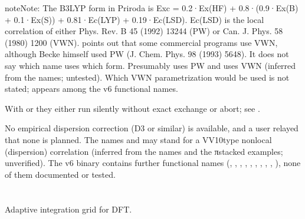 \documentclass[letterpaper,10pt,english,openany,oneside]{sphinxmanual}
\begin{document}
\begin{sphinxadmonition}{note}{Note:}
\sphinxAtStartPar
The B3LYP form in Priroda is
Exc = 0.2·Ex(HF) + 0.8·(0.9·Ex(B) + 0.1·Ex(S)) + 0.81·Ec(LYP) + 0.19·Ec(LSD).
Ec(LSD) is the local correlation of either Phys. Rev. B 45 (1992) 13244 (PW) or Can. J. Phys. 58 (1980) 1200 (VWN).
 points out that some commercial programs use VWN, although Becke himself used PW
(J. Chem. Phys. 98 (1993) 5648). It does not say which name uses which form. Presumably  uses PW and
 uses VWN (inferred from the names; untested). Which VWN parametrization would be used is not stated;
 appears among the v6 functional names.

\sphinxAtStartPar
{} With  or  they either
run silently without exact exchange or abort; see .

\sphinxAtStartPar
No empirical dispersion correction (D3 or similar) is available, and a user relayed that none is planned.
The names  and  may stand for a VV10\sphinxhyphen{}type nonlocal (dispersion) correlation (inferred from the
names and the π\sphinxhyphen{}stacked examples; unverified). The v6 binary contains further functional
names (, , , , , , , , , ), none of
them documented or tested.
\end{sphinxadmonition}

\sphinxAtStartPar
{} {\hyperref[\detokenize{reference/control:control-theory}]{}}

\sphinxstepscope




\section{}
\label{\detokenize{reference/grid:grid}}\label{\detokenize{reference/grid:group-grid}}\label{\detokenize{reference/grid::doc}}
\ignorespaces 
\sphinxAtStartPar
Adaptive integration grid for DFT.
\end{document}
